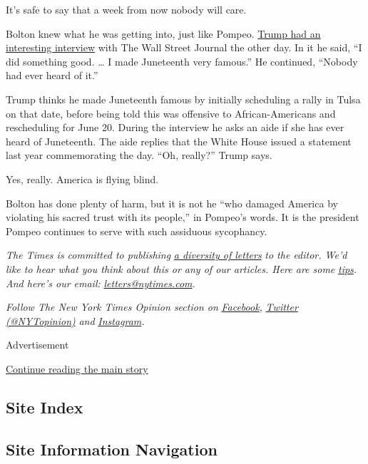 It's safe to say that a week from now nobody will care.

Bolton knew what he was getting into, just like Pompeo.
\href{https://www.wsj.com/articles/trump-talks-juneteenth-john-bolton-economy-in-wsj-interview-11592493771}{Trump
had an interesting interview} with The Wall Street Journal the other
day. In it he said, ``I did something good. \ldots{} I made Juneteenth
very famous.'' He continued, ``Nobody had ever heard of it.''

Trump thinks he made Juneteenth famous by initially scheduling a rally
in Tulsa on that date, before being told this was offensive to
African-Americans and rescheduling for June 20. During the interview he
asks an aide if she has ever heard of Juneteenth. The aide replies that
the White House issued a statement last year commemorating the day.
``Oh, really?'' Trump says.

Yes, really. America is flying blind.

Bolton has done plenty of harm, but it is not he ``who damaged America
by violating his sacred trust with its people,'' in Pompeo's words. It
is the president Pompeo continues to serve with such assiduous
sycophancy.

\emph{The Times is committed to publishing}
\href{https://www.nytimes.com/2019/01/31/opinion/letters/letters-to-editor-new-york-times-women.html}{\emph{a
diversity of letters}} \emph{to the editor. We'd like to hear what you
think about this or any of our articles. Here are some}
\href{https://help.nytimes.com/hc/en-us/articles/115014925288-How-to-submit-a-letter-to-the-editor}{\emph{tips}}\emph{.
And here's our email:}
\href{mailto:letters@nytimes.com}{\emph{letters@nytimes.com}}\emph{.}

\emph{Follow The New York Times Opinion section on}
\href{https://www.facebook.com/nytopinion}{\emph{Facebook}}\emph{,}
\href{http://twitter.com/NYTOpinion}{\emph{Twitter (@NYTopinion)}}
\emph{and}
\href{https://www.instagram.com/nytopinion/}{\emph{Instagram}}\emph{.}

Advertisement

\protect\hyperlink{after-bottom}{Continue reading the main story}

\hypertarget{site-index}{%
\subsection{Site Index}\label{site-index}}

\hypertarget{site-information-navigation}{%
\subsection{Site Information
Navigation}\label{site-information-navigation}}


